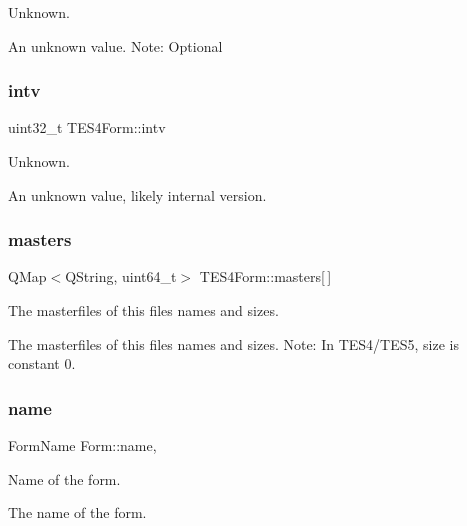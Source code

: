 Unknown. 

An unknown value. Note\+: Optional \mbox{\label{class_t_e_s4_form_ab3ed4c6fda85359543c27f80bb118247}} 
\subsubsection{\texorpdfstring{intv}{intv}}
{\footnotesize\ttfamily uint32\+\_\+t T\+E\+S4\+Form\+::intv\hspace{0.3cm}{\ttfamily [protected]}}



Unknown. 

An unknown value, likely internal version. \mbox{\label{class_t_e_s4_form_a4456691dfb90f6f6e7cd734fd6ac5ceb}} 
\subsubsection{\texorpdfstring{masters}{masters}}
{\footnotesize\ttfamily Q\+Map$<$Q\+String, uint64\+\_\+t$>$ T\+E\+S4\+Form\+::masters\mbox{[}$\,$\mbox{]}\hspace{0.3cm}{\ttfamily [protected]}}



The masterfiles of this file\textquotesingle{}s names and sizes. 

The masterfiles of this file\textquotesingle{}s names and sizes. Note\+: In T\+E\+S4/\+T\+E\+S5, size is constant 0. \mbox{\label{class_form_a3a19912be281bc3e9c99911bb70e0f4b}} 
\subsubsection{\texorpdfstring{name}{name}}
{\footnotesize\ttfamily Form\+Name Form\+::name\hspace{0.3cm}{\ttfamily [protected]}, {\ttfamily [inherited]}}



Name of the form. 

The name of the form. \mbox{\label{class_t_e_s4_form_ab88581c781ac52043756b241aaf81e0a}} 
